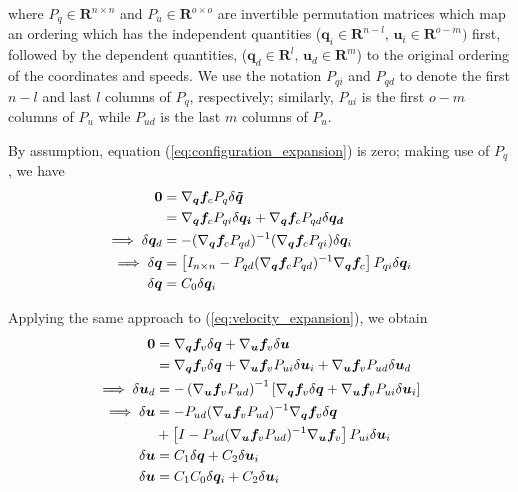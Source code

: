 \documentclass[smallcondensed]{svjour3}                     %
\begin{document}
where $P_q \in \mathbf{R}^{n \times n}$ and $P_u \in \mathbf{R}^{o \times o}$
are invertible permutation matrices which map an ordering which has the
independent quantities ($\bm{q}_{i}\in\mathbf{R}^{n-l},\,
\bm{u}_{i}\in\mathbf{R}^{o-m})$ first, followed by the dependent quantities,
($\bm{q}_{d}\in\mathbf{R}^{l},\, \bm{u}_{d}\in\mathbf{R}^{m}$) to the original
ordering of the coordinates and speeds.  We use the notation $P_{qi}$ and
$P_{qd}$ to denote the first $n-l$ and last $l$ columns of $P_q$, respectively;
similarly, $P_{ui}$ is the first $o-m$ columns of $P_{u}$ while $P_{ud}$ is the
last $m$ columns of $P_u$.

By assumption, equation
(\ref{eq:configuration_expansion}) is zero; making use of $P_q$, we have
\begin{align}
  \bm{0} &= \nabla_{\bm{q}}\bm{f}_{c} P_{q} \delta \bm{\tilde{q}} \notag \\
   &= \nabla_{\bm{q}}\bm{f}_{c} P_{qi} \delta \bm{q_i} +
  \nabla_{\bm{q}}\bm{f}_{c} P_{qd} \delta \bm{q_d}\notag\\
  \implies \delta \bm{q}_d &= -(\nabla_{\bm{q}}\bm{f}_{c} P_{qd})^{-1}
  (\nabla_{\bm{q}}\bm{f}_{c} P_{qi}) \delta \bm{q}_i \notag\\
  \implies \delta \bm{q} &= \left[ I_{n \times n} - P_{qd}(\nabla_{\bm{q}}
    \bm{f}_{c} P_{qd})^{-1} \nabla_{\bm{q}} \bm{f}_{c} \right] P_{qi} \delta
    \bm{q}_i\\
  \label{eq:delta_q}
  \delta \bm{q} &= C_0 \delta \bm{q}_i
\end{align}

Applying the same approach to (\ref{eq:velocity_expansion}), we obtain
\begin{align}
  \bm{0} &= \nabla_{\bm{q}}\bm{f}_{v} \delta \bm{q} +
  \nabla_{\bm{u}}\bm{f}_{v} \delta \bm{u}\notag\\
  &= \nabla_{\bm{q}} \bm{f}_{v}
\delta \bm{q} + \nabla_{\bm{u}} \bm{f}_{v} P_{ui} \delta \bm{u}_i +
\nabla_{\bm{u}} \bm{f}_{v} P_{ud} \delta \bm{u}_d \notag\\
\implies \delta \bm{u}_d &= -\left(\nabla_{\bm{u}} \bm{f}_{v}
P_{ud}\right)^{-1}\left[\nabla_{\bm{q}}\bm{f}_{v} \delta\bm{q} +
  \nabla_{\bm{u}} \bm{f}_{v} P_{ui} \delta \bm{u}_i \right]\notag\\
  \implies \delta \bm{u} &= -P_{ud}(\nabla_{\bm{u}} \bm{f}_{v} P_{ud})^{-1}
  \nabla_{\bm{q}} \bm{f}_{v} \delta \bm{q}\notag\\
  &+ \left[I - P_{ud} (\nabla_{\bm{u}}\bm{f}_{v} P_{ud})^{-1} \nabla_{\bm{u}}
    \bm{f}_{v} \right] P_{ui} \delta \bm{u}_i\\
  \delta \bm{u} &= C_1 \delta \bm{q} + C_2 \delta \bm{u}_i\notag\\
  \label{eq:delta_u}
  \delta \bm{u} &= C_1 C_0 \delta \bm{q}_i + C_2 \delta \bm{u}_i
\end{align}
\end{document}
